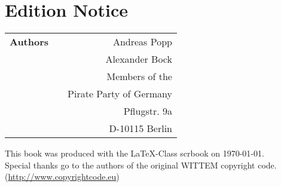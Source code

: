 \section*{Edition Notice}

\vfill
	
\begin{center}
	\begin{tabular}{lp{1em}r}
		\bfseries Authors						 	&& Andreas Popp\\%
																	&& Alexander Bock\\[2ex]
																	&& \scriptsize Members of the\\[1ex]
																 	&& Pirate Party of Germany\\[1ex]
																 	&& Pflugstr. 9a\\
																 	&& D-10115 Berlin\\[4ex]

%
	\end{tabular}
\end{center}

\vfill\footnotesize This book was produced with the \LaTeX-Class scrbook on \today.\\

Special thanks go to the authors of the original WITTEM copyright code.\\ (\url{http://www.copyrightcode.eu})